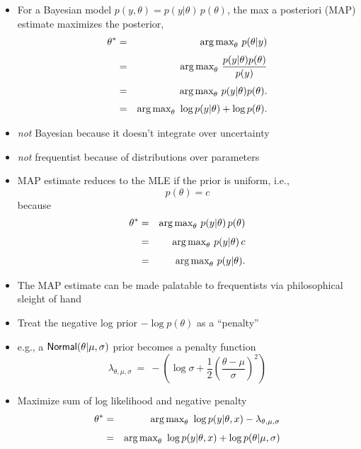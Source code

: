 \documentclass[10pt]{report}
\begin{document}
%
\vspace*{-4pt}
\begin{itemize}
\item For a Bayesian model $p(y,\theta) = p(y|\theta) \, p(\theta)$,
the max a posteriori (MAP) estimate maximizes the posterior,
\begin{eqnarray*}
\theta^{*}
& = & \mbox{arg\,max}_{\theta} \ p(\theta|y)
\\[3pt]
& = & \mbox{arg\,max}_{\theta} \ \frac{\displaystyle p(y|\theta) p(\theta)}{p(y)}
\\[3pt]
& = & \mbox{arg\,max}_{\theta} \ p(y|\theta) p(\theta).
\\[3pt]
& = & \mbox{arg\,max}_{\theta} \ \log p(y|\theta) + \log p(\theta).
\end{eqnarray*}
\item \emph{not} Bayesian because it doesn't integrate over uncertainty
\item \emph{not} frequentist because of distributions over parameters
\end{itemize}


%
\begin{itemize}
\item MAP estimate reduces to the MLE if the prior is uniform, i.e.,
\[
p(\theta) = c
\]
because
\begin{eqnarray*}
\theta^{*} & = & \mbox{arg\,max}_{\theta} \ p(y|\theta) \, p(\theta)
\\[4pt]
& = & \mbox{arg\,max}_{\theta} \ p(y|\theta) \, c
\\[4pt]
& = & \mbox{arg\,max}_{\theta} \ p(y|\theta).
\end{eqnarray*}
\end{itemize}


%
\begin{itemize}
\item The MAP estimate can be made palatable to frequentists
via philosophical sleight of hand
\item Treat the negative log prior $-\log p(\theta)$ as a ``penalty''
\item e.g., a $\text{\sf Normal}(\theta|\mu,\sigma)$ prior becomes a penalty function
\[
\lambda_{\theta, \mu,\sigma}
\  = \
-\left(
   \log \sigma + \frac{1}{2}\left(\frac{\theta -  \mu}{\sigma}\right)^2
 \right)
\]
\item Maximize sum of log likelihood and negative penalty
\begin{eqnarray*}
\theta^{*}
& = & \mbox{arg\,max}_{\theta} \ \log p(y|\theta,x) - \lambda_{\theta,\mu,\sigma}
\\[4pt]
& = & \mbox{arg\,max}_{\theta} \ \log p(y|\theta,x) + \log p(\theta|\mu,\sigma)
\end{eqnarray*}
\end{itemize}
\end{document}
